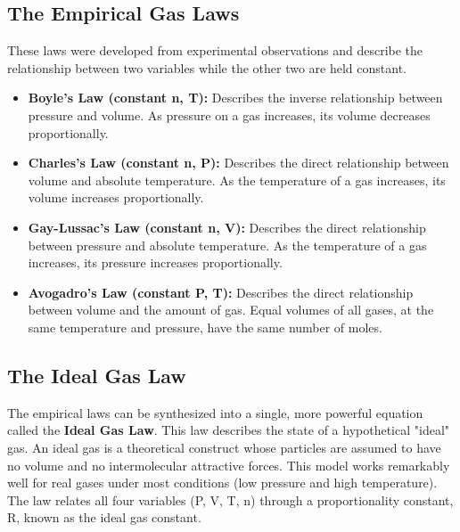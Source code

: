 \documentclass{article}
\begin{document}
\subsection{The Empirical Gas Laws}
These laws were developed from experimental observations and describe the relationship between two variables while the other two are held constant.
\begin{itemize}
    \item \textbf{Boyle's Law (constant n, T):} Describes the inverse relationship between pressure and volume. As pressure on a gas increases, its volume decreases proportionally.
    \item \textbf{Charles's Law (constant n, P):} Describes the direct relationship between volume and absolute temperature. As the temperature of a gas increases, its volume increases proportionally.
    \item \textbf{Gay-Lussac's Law (constant n, V):} Describes the direct relationship between pressure and absolute temperature. As the temperature of a gas increases, its pressure increases proportionally.
    \item \textbf{Avogadro's Law (constant P, T):} Describes the direct relationship between volume and the amount of gas. Equal volumes of all gases, at the same temperature and pressure, have the same number of moles.
\end{itemize}

\subsection{The Ideal Gas Law}
The empirical laws can be synthesized into a single, more powerful equation called the \textbf{Ideal Gas Law}. This law describes the state of a hypothetical "ideal" gas. An ideal gas is a theoretical construct whose particles are assumed to have no volume and no intermolecular attractive forces. This model works remarkably well for real gases under most conditions (low pressure and high temperature). The law relates all four variables (P, V, T, n) through a proportionality constant, R, known as the ideal gas constant.
\end{document}
